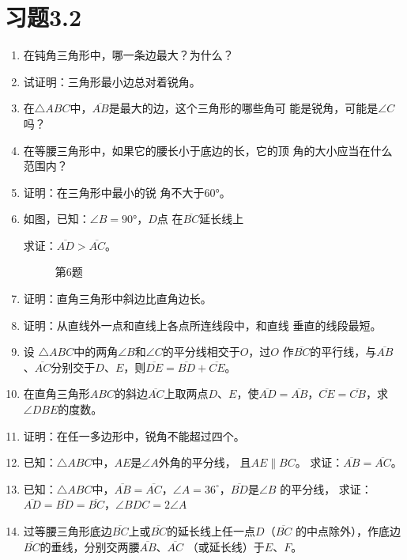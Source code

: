 \section*{习题3.2}
\begin{enumerate}
    \item 在钝角三角形中，哪一条边最大？为什么？
    \item 试证明：三角形最小边总对着锐角。
    \item 在$\triangle ABC$中，$\overline{AB}$是最大的边，这个三角形的哪些角可
    能是锐角，可能是$\angle C$吗？

    \item 在等腰三角形中，如果它的腰长小于底边的长，它的顶
    角的大小应当在什么范围内？
    \item 证明：在三角形中最小的锐
    角不大于$\ang{60}$。
    \item 如图，已知：$\angle B=\ang{90}$，$D$点
    在$\overline{BC}$延长线上

    求证：$\overline{AD}>\overline{AC}$。

\begin{figure}
\begin{tikzpicture}
\end{tikzpicture}
    \caption*{第6题}
\end{figure}

    \item 证明：直角三角形中斜边比直角边长。
    \item 证明：从直线外一点和直线上各点所连线段中，和直线
    垂直的线段最短。
    \item 设 $\triangle ABC$中的两角$\angle B$和$\angle C$的平分线相交于$O$，过$O$
    作$\overline{BC}$的平行线，与$\overline{AB}$、$\overline{AC}$分别交于$D$、$E$，则$\overline{DE}=
    \overline{BD}+\overline{CE}$。
    \item 在直角三角形$ABC$的斜边$\overline{AC}$上取两点$D$、$E$，使$\overline{AD}=\overline{AB}$，$\overline{CE}=\overline{CB}$，求$\angle DBE$的度数。
    \item 证明：在任一多边形中，锐角不能超过四个。
    \item 已知：$\triangle ABC$中，$AE$是$\angle A$外角的平分线，
    且$AE\parallel BC$。
    求证：$\overline{AB}=\overline{AC}$。
    \item 已知：$\triangle ABC$中，$\overline{AB}=\overline{AC}$，$\angle A=36^{\circ}$，$\overline{BD}$是$\angle B$
    的平分线，
    求证：$\overline{AD}=\overline{BD}=\overline{BC}$，$\angle BDC=2\angle A$
    \item 过等腰三角形底边$\overline{BC}$上或$\overline{BC}$的延长线上任一点$D$（$\overline{BC}$
    的中点除外），作底边$\overline{BC}$的垂线，分别交两腰$\overline{AB}$、$\overline{AC}$
    （或延长线）于$E$、$F$。


\end{enumerate}
